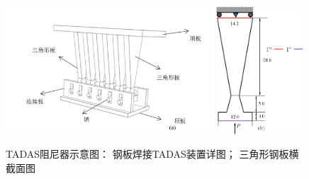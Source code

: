 \begin{figure}[H]
    \centering
    \begin{subcaptiongroup}
            \includegraphics[width=0.69\textwidth]{figure/TADAS/2.png}
            \label{TADAS2}
            \includegraphics[width=0.29\textwidth]{figure/TADAS/3.png}
            \label{TADAS3}
            \end{subcaptiongroup}
        \caption{TADAS阻尼器示意图： 钢板焊接TADAS装置详图； 三角形钢板横截面图}
    \label{TADAS2}
\end{figure}


